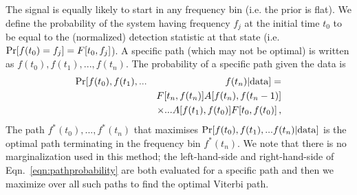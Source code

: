 \documentclass[paper-main.tex]{subfiles}
\begin{document}
The signal is equally likely to start in any frequency bin (i.e. the prior is flat). 
We define the probability of the system having frequency $f_j$ at the initial time $t_0$ to be equal to the (normalized) detection statistic at that state (i.e.\  ${\rm Pr}[f(t_0) = f_j] = F[t_0,f_j]$).
A specific path (which may not be optimal) is written as $f(t_0), f(t_1),..., f(t_n)$. 
The probability of a specific path given the data is 
\begin{eqnarray}
{\rm Pr}[ f(t_0), f(t_1),... && f(t_n) | {\rm data}] = \nonumber\\
          && F[t_n,f(t_n)] A[f(t_n),f(t_n-1)] \nonumber \\
          && \times... A[f(t_1),f(t_0)] F[t_0,f(t_0)] \,,
\label{eqn:pathprobability}
\end{eqnarray}
The path $f^\ast(t_0),...,f^\ast(t_n)$ that maximises ${\rm Pr}[ f(t_0), f(t_1),... f(t_n) | {\rm data}]$ is the optimal path terminating in the frequency bin $f^\ast(t_n)$. 
We note that there is no marginalization used in this method; the left-hand-side and right-hand-side of Eqn.~\ref{eqn:pathprobability} are both evaluated for a specific path and then we maximize over all such paths to find the optimal Viterbi path. 
\end{document}
